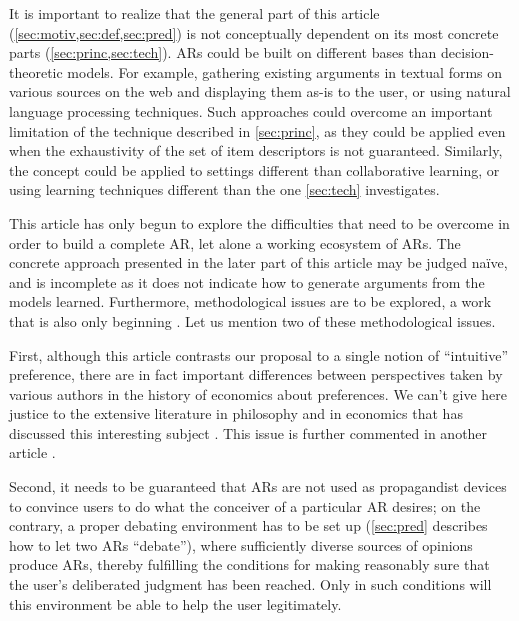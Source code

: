 \documentclass[version=3.21, pagesize, twoside=off, bibliography=totoc, DIV=calc, fontsize=12pt, a4paper, french, english]{scrartcl}
\begin{document}
It is important to realize that the general part of this article (\cref{sec:motiv,sec:def,sec:pred}) is not conceptually dependent on its most concrete parts (\cref{sec:princ,sec:tech}). \Acp{AR} could be built on different bases than decision-theoretic models. For example, gathering existing arguments in textual forms on various sources on the web and displaying them as-is to the user, or using natural language processing techniques. 
Such approaches could overcome an important limitation of the technique described in \cref{sec:princ}, as they could be applied even when the exhaustivity of the set of item descriptors is not guaranteed.
Similarly, the concept could be applied to settings different than collaborative learning, or using learning techniques different than the one \cref{sec:tech} investigates.

This article has only begun to explore the difficulties that need to be overcome in order to build a complete \ac{AR}, let alone a working ecosystem of \acp{AR}. The concrete approach presented in the later part of this article may be judged naïve, and is incomplete as it does not indicate how to generate arguments from the models learned. 
Furthermore, methodological issues are to be explored, a work that is also only beginning \citep{cailloux_formal_2018}. Let us mention two of these methodological issues.

First,
although this article contrasts our proposal to a single notion of “intuitive” preference, there are in fact important differences between perspectives taken by various authors in the history of economics about preferences. We can’t give here justice to the extensive literature in philosophy and in economics that has discussed this interesting subject \citep{bruni_vilfredo_2001}. This issue is further commented in another article \citep{meinard_justification_2018}.

Second, it needs to be guaranteed that \acp{AR} are not used as propagandist devices to convince users to do what the conceiver of a particular \ac{AR} desires; on the contrary, a proper debating environment has to be set up (\cref{sec:pred} describes how to let two \acp{AR} “debate”), where sufficiently diverse sources of opinions produce \acp{AR}, thereby fulfilling the conditions for making reasonably sure that the user’s deliberated judgment has been reached. Only in such conditions will this environment be able to help the user legitimately.



\appendix
\end{document}
